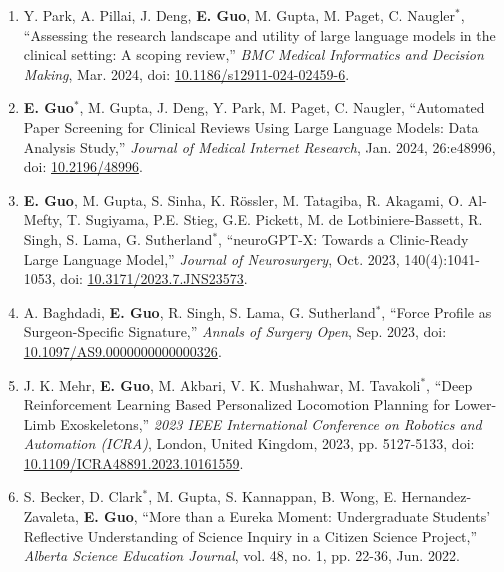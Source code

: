 \documentclass{article}
\begin{document}
\begin{enumerate}
    \item Y. Park, A. Pillai, J. Deng, \textbf{E. Guo}, M. Gupta, M. Paget, C. Naugler$^*$, ``Assessing the research landscape and utility of large language models in the clinical setting: A scoping review,'' \textit{BMC Medical Informatics and Decision Making}, Mar. 2024, doi: \href{https://doi.org/10.1186/s12911-024-02459-6}{10.1186/s12911-024-02459-6}.
    \item \textbf{E. Guo}$^*$, M. Gupta, J. Deng, Y. Park, M. Paget, C. Naugler, ``Automated Paper Screening for Clinical Reviews Using Large Language Models: Data Analysis Study,'' \textit{Journal of Medical Internet Research}, Jan. 2024, 26:e48996, doi: \href{https://doi.org/10.2196/48996}{10.2196/48996}.
    \item \textbf{E. Guo}, M. Gupta, S. Sinha, K. R\"ossler, M. Tatagiba, R. Akagami, O. Al-Mefty, T. Sugiyama, P.E. Stieg, G.E. Pickett, M. de Lotbiniere-Bassett, R. Singh, S. Lama, G. Sutherland$^*$, ``neuroGPT-X: Towards a Clinic-Ready Large Language Model,'' \textit{Journal of Neurosurgery}, Oct. 2023, 140(4):1041-1053, doi: \href{https://doi.org/10.3171/2023.7.JNS23573}{10.3171/2023.7.JNS23573}.
    \item A. Baghdadi, \textbf{E. Guo}, R. Singh, S. Lama, G. Sutherland$^*$, ``Force Profile as Surgeon-Specific Signature,'' \textit{Annals of Surgery Open}, Sep. 2023, doi: \href{https://doi.org/10.1097/AS9.0000000000000326}{10.1097/AS9.0000000000000326}.
    \item J. K. Mehr, \textbf{E. Guo}, M. Akbari, V. K. Mushahwar, M. Tavakoli$^*$, ``Deep Reinforcement Learning Based Personalized Locomotion Planning for Lower-Limb Exoskeletons,'' \textit{2023 IEEE International Conference on Robotics and Automation (ICRA)}, London, United Kingdom, 2023, pp. 5127-5133, doi: \href{https://doi.org/10.1109/ICRA48891.2023.10161559}{10.1109/ICRA48891.2023.10161559}.
    \item S. Becker, D. Clark$^*$, M. Gupta, S. Kannappan, B. Wong, E. Hernandez-Zavaleta, \textbf{E. Guo}, ``More than a Eureka Moment: Undergraduate Students' Reflective Understanding of Science Inquiry in a Citizen Science Project,'' \textit{Alberta Science Education Journal}, vol. 48, no. 1, pp. 22-36, Jun. 2022.
\end{enumerate} \vspace{1em}
\end{document}
